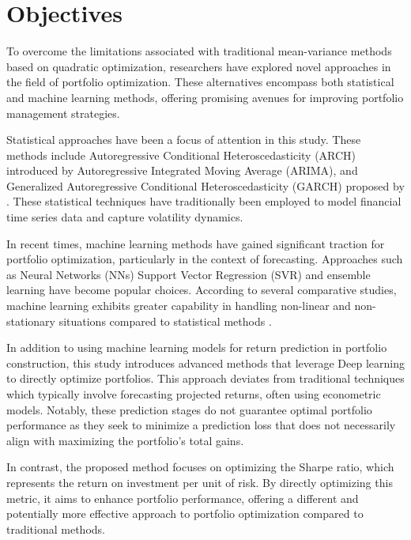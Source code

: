 \section{Objectives}\label{I_objective}
To overcome the limitations associated with traditional mean-variance methods based on quadratic optimization, researchers have explored novel approaches in the field of portfolio optimization. These alternatives encompass both statistical and machine learning methods, offering promising avenues for improving portfolio management strategies.

Statistical approaches have been a focus of attention in this study. These methods include Autoregressive Conditional Heteroscedasticity (ARCH) introduced by  Autoregressive Integrated Moving Average (ARIMA), and Generalized Autoregressive Conditional Heteroscedasticity (GARCH) proposed by . These statistical techniques have traditionally been employed to model financial time series data and capture volatility dynamics.

In recent times, machine learning methods have gained significant traction for portfolio optimization, particularly in the context of forecasting. Approaches such as Neural Networks (NNs) \citep{Bisoi2019652} Support Vector Regression (SVR) \citep{Chen2015435} and ensemble learning \citep{Zhou2019} have become popular choices. According to several comparative studies, machine learning exhibits greater capability in handling non-linear and non-stationary situations compared to statistical methods \citep{Wang2020}.

In addition to using machine learning models for return prediction in portfolio construction, this study introduces advanced methods that leverage Deep learning to directly optimize portfolios. This approach deviates from traditional techniques \citep{McNeil20151} which typically involve forecasting projected returns, often using econometric models. Notably, these prediction stages do not guarantee optimal portfolio performance \citep{Moody1998441} as they seek to minimize a prediction loss that does not necessarily align with maximizing the portfolio's total gains.

In contrast, the proposed method focuses on optimizing the Sharpe ratio, which represents the return on investment per unit of risk. By directly optimizing this metric, it aims to enhance portfolio performance, offering a different and potentially more effective approach to portfolio optimization compared to traditional methods.


